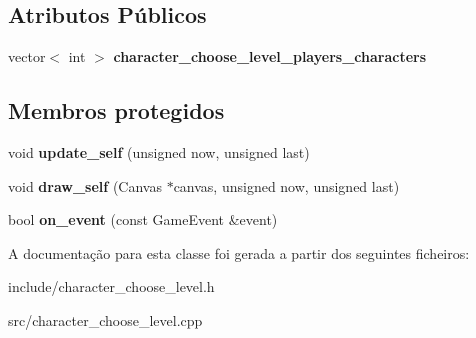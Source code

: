 \subsection*{Atributos Públicos}
\begin{DoxyCompactItemize}
\item 
\mbox{\label{classCharacterChooseLevel_a971370beafa7380fd2472f699ff6e40f}} 
vector$<$ int $>$ {\bfseries character\+\_\+choose\+\_\+level\+\_\+players\+\_\+characters}
\end{DoxyCompactItemize}
\subsection*{Membros protegidos}
\begin{DoxyCompactItemize}
\item 
\mbox{\label{classCharacterChooseLevel_a28a65c50ef528b2fb2d12ebef93e7426}} 
void {\bfseries update\+\_\+self} (unsigned now, unsigned last)
\item 
\mbox{\label{classCharacterChooseLevel_ac124d3fb4690e5b369a95f49758592ca}} 
void {\bfseries draw\+\_\+self} (Canvas $\ast$canvas, unsigned now, unsigned last)
\item 
\mbox{\label{classCharacterChooseLevel_a2fb500ba943a4f22ed01be915b59452a}} 
bool {\bfseries on\+\_\+event} (const Game\+Event \&event)
\end{DoxyCompactItemize}


A documentação para esta classe foi gerada a partir dos seguintes ficheiros\+:\begin{DoxyCompactItemize}
\item 
include/character\+\_\+choose\+\_\+level.\+h\item 
src/character\+\_\+choose\+\_\+level.\+cpp\end{DoxyCompactItemize}
